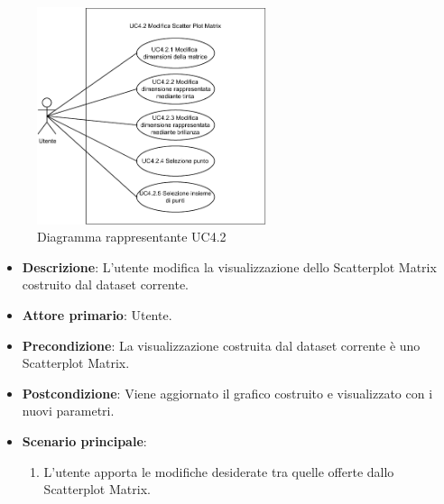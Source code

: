 \begin{figure}[h]
    \centering
    \includegraphics[width=0.6\textwidth]{componenti/casi-duso/diagrammi/UC4_2.pdf}
    \caption{Diagramma rappresentante UC4.2}
    \label{fig:UC4.2}
\end{figure}


\begin{itemize}
    \item \textbf{Descrizione}: L’utente modifica la visualizzazione dello Scatterplot Matrix
                                costruito dal dataset corrente.
	
    \item \textbf{Attore primario}: Utente.
    
    \item \textbf{Precondizione}:   La visualizzazione costruita dal dataset corrente è uno Scatterplot Matrix.

    \item \textbf{Postcondizione}:  Viene aggiornato il grafico costruito e visualizzato con i nuovi parametri.

	\item \textbf{Scenario principale}:
		\begin{enumerate}
            \item L'utente apporta le modifiche desiderate tra quelle offerte dallo Scatterplot Matrix.
        \end{enumerate}
\end{itemize}


